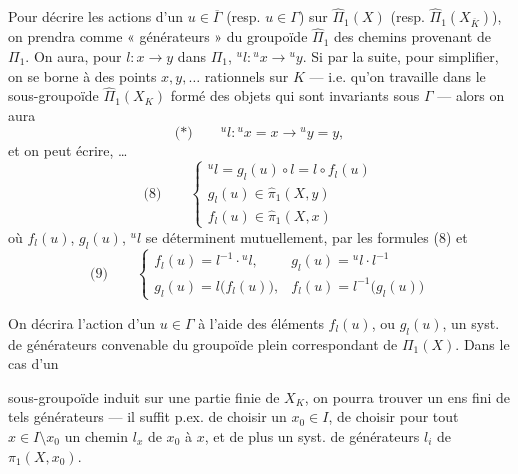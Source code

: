 \documentclass[11pt,a4paper]{article}
\begin{document}
Pour décrire les actions d'un $u \in \overline{\Gamma}$ (resp. $u \in \Gamma$) sur $\widehat{\Pi}_1(X)$ (resp. \struck{$\Pi$} $\widehat{\Pi}_1(X_{\overline{K}})$), on prendra comme « générateurs » du groupoïde $\widehat{\Pi}_1$ des chemins provenant de $\Pi_1$. On aura, pour $l : x \to y$ dans $\Pi_1$, ${}^{u}l : {}^{u}x \to {}^{u}y$. Si \struck{\ill{}} par la suite, pour simplifier, on se borne à des points $x, y, \ldots$ rationnels sur $K$ — i.e. qu'on travaille dans le sous-groupoïde $\widehat{\Pi}_1(X_K)$ formé des objets qui sont invariants sous $\Gamma$ — alors on aura
\[
\text{(*)}\qquad {}^{u}l : {}^{u}x = x \longrightarrow {}^{u}y = y ,
\]
et on peut écrire, \struck{\ill{}}…
\[
\text{(8)}\qquad
\begin{cases}
{}^{u}l = g_l(u)\circ l = l \circ f_l(u) \\
g_l(u) \in \widehat{\pi}_1(X,y) \\
f_l(u) \in \widehat{\pi}_1(X,x)
\end{cases}
\]
où $f_l(u)$, $g_l(u)$, ${}^{u}l$ se déterminent mutuellement,  par les formules (8) et
\[
\text{(9)}\qquad
\begin{cases}
f_l(u) = l^{-1}\cdot{}^{u}l , & g_l(u) = {}^{u}l\cdot l^{-1} \\
g_l(u) = l\bigl(f_l(u)\bigr) , & f_l(u) = l^{-1}\bigl(g_l(u)\bigr)
\end{cases}
\]


On décrira l'action d'un $u \in \Gamma$  à l'aide des éléments $f_l(u)$, ou $g_l(u)$,   un syst. de générateurs convenable du groupoïde plein correspondant de $\Pi_1(X)$. Dans le cas d'un

sous-groupoïde induit sur une partie finie  de $X_K$, on pourra trouver un ens fini de tels générateurs — il suffit p.ex. de choisir un \struck{\ill{}} $x_0 \in I$, de choisir pour tout $x \in I \setminus x_0$ un chemin $l_x$ de $x_0$ à $x$, et de plus un syst.  de générateurs $l_i$ de $\pi_1(X,x_0)$.
\end{document}
